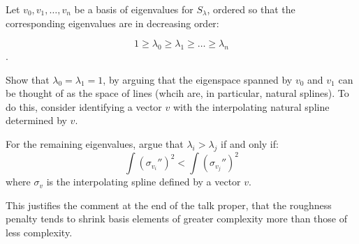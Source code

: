 %
%
\begin{frame}
  Let $v_0, v_1, \ldots, v_n$ be a basis of eigenvalues for $S_{\lambda}$, ordered so that the corresponding eigenvalues are in decreasing order: 
  
  $$1 \geq \lambda_0 \geq \lambda_1 \geq \ldots \geq \lambda_n $$.

  Show that $\lambda_0 = \lambda_1 = 1$, by arguing that the eigenspace spanned by $v_0$ and $v_1$ can be thought of as the space of lines (whcih are, in particular, natural splines).  To do this, consider identifying a vector $v$ with the interpolating natural spline determined by $v$.
\end{frame}
%
%
\begin{frame}
  For the remaining eigenvalues, argue that $\lambda_i > \lambda_j$ if and only if:
  $$ \int (\sigma_{v_i}'')^2 < \int (\sigma_{v_j}'')^2 $$
where $\sigma_v$ is the interpolating spline defined by a vector $v$.

  This justifies the comment at the end of the talk proper, that the roughness penalty tends to shrink basis elements of greater complexity more than those of less complexity.
\end{frame}
